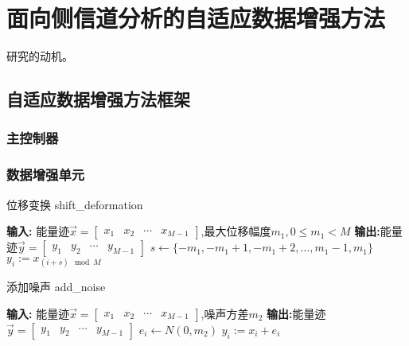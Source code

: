 \chapter{面向侧信道分析的自适应数据增强方法}\label{chap:search1}{
	研究的动机。
	\section{自适应数据增强方法框架}
	\subsection{主控制器}
	\subsection{数据增强单元}
	
	\begin{algorithm}
		\caption{位移变换 shift\_deformation}\label{alg:shift}
		\begin{algorithmic}[1]
			\Statex \textbf{输入:} 能量迹$\vec x=\begin{bmatrix}
			x_1&x_2&\cdots&x_{M-1}
			\end{bmatrix}$,最大位移幅度$m_1, 0\le m_1<M$
			\Statex \textbf{输出:}能量迹$\vec y=\begin{bmatrix}
			y_1&y_2&\cdots&y_{M-1}
			\end{bmatrix}$
			\State $s\gets\{-m_1,-m_1+1,-m_1+2,\dots,m_1-1,m_1\}$
			\State $y_i:= x_{(i+s)\mod M}$
			\EndFor
		\end{algorithmic}
	\end{algorithm}
	
	\begin{algorithm}
		\caption{添加噪声 add\_noise}\label{alg:noise}
		\begin{algorithmic}[1]
			\Statex \textbf{输入:} 能量迹$\vec x=\begin{bmatrix}
			x_1&x_2&\cdots&x_{M-1}
			\end{bmatrix}$,噪声方差$m_2$
			\Statex \textbf{输出:}能量迹$\vec y=\begin{bmatrix}
			y_1&y_2&\cdots&y_{M-1}
			\end{bmatrix}$
			\For{$n = 0, \dots, M-1$}
			\State $e_i\gets N(0,m_2)$
			\State $y_i:= x_i+e_i$
			\EndFor
		\end{algorithmic}
	\end{algorithm}
	
}
